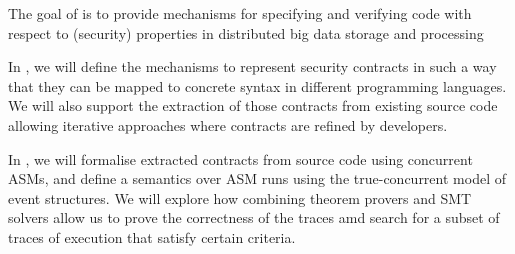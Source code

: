 \begin{Workpackage}{\thewpno}
\begin{WPObjectives}




\end{WPObjectives}

\begin{WPDescription}

The goal of \theWP{} is to provide mechanisms for specifying and verifying code with respect to
(security) properties in distributed big data storage and processing

\end{WPDescription}



\begin{Task}

\TaskResults{%
}
\TaskHeader{}

In \theTask, we will define the mechanisms to represent security contracts
in such a way that they can be mapped to concrete syntax in different
programming languages. We will also support the extraction of those contracts
from existing source code allowing iterative approaches where contracts
are refined by developers.
\end{Task}

\begin{Task}

\TaskResults{%
}
\TaskHeader{}

In \theTask, we will formalise extracted contracts from source code using concurrent ASMs, and define a semantics over ASM runs using the true-concurrent model of event structures. 
We will explore how combining theorem provers and SMT solvers allow us to prove the correctness of the traces amd search for a subset of traces of execution that satisfy certain criteria.

\end{Task}



\end{Workpackage}
